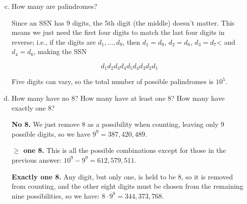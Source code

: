 \documentclass{article}
\begin{document}
\begin{enumerate}[(a)]\setcounter{enumi}{2}
    \item How many are palindromes?

      Since an SSN has 9 digits, the 5th digit (the middle) doesn't matter. This means we just need the first four digits to match the last four digits in reverse; i.e., if the digits are $d_1, \dots, d_9$, then $d_1 = d_9$, $d_2 = d_8$, $d_3 = d_7$< and $d_4 = d_6$, making the SSN

      $$d_1 d_2 d_3 d_4 d_5 d_4 d_3 d_2 d_1$$

      Five digits can vary, so the total number of possible palindromes is $10^5$.
    \item How many have no 8? How many have at least one 8? How many have exactly one 8?

      \textbf{No 8.} We just remove 8 as a possibility when counting, leaving only 9 possible digits, so we have $9^9 = 387,420,489$.

      \textbf{$\geq$ one 8.} This is all the possible combinations except for those in the previous answer: $10^9 - 9^9 = 612,579,511$.

      \textbf{Exactly one 8.} Any digit, but only one, is held to be 8, so it is removed from counting, and the other eight digits must be chosen from the remaining nine possibilities, so we have: $8 \cdot 9^8 = 344,373,768$.
\end{enumerate}
\end{document}
